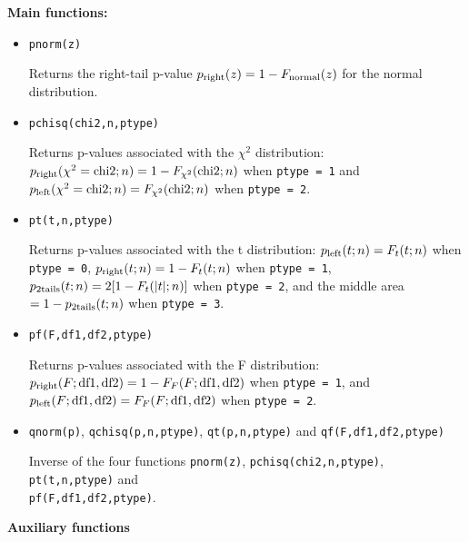 \documentclass[12pt]{article}
\begin{document}
{\bf Main functions:} 

\begin{itemize} 
\item {\tt pnorm(z)} 

Returns the right-tail p-value $p_{\rm right}(z)=1-F_{\rm normal}(z)$ 
for the normal distribution. 

\item {\tt pchisq(chi2,n,ptype)}

Returns p-values associated with the $\chi^2$ distribution: 
$p_{\rm right}(\chi^2={\rm chi2};n)=1-F_{\chi^2}({\rm chi2};n)$ when {\tt ptype = 1} and
$p_{\rm left}(\chi^2={\rm chi2};n)=F_{\chi^2}({\rm chi2};n)$ when {\tt ptype = 2}.

\item {\tt pt(t,n,ptype)}

Returns p-values associated with the t distribution:
$p_{\rm left}(t;n)=F_t(t;n)$ when {\tt ptype = 0},
$p_{\rm right}(t;n)=1-F_t(t;n)$ when {\tt ptype = 1},
$p_{\rm 2tails}(t;n)=2[1-F_t(|t|;n)]$ when {\tt ptype = 2},
and the middle area $=1-p_{\rm 2tails}(t;n)$ when {\tt ptype = 3}.

\item {\tt pf(F,df1,df2,ptype)}

Returns p-values associated with the F distribution:
$p_{\rm right}(F; {\rm df1,df2})=1-F_F(F; {\rm df1,df2})$ when
{\tt ptype = 1}, and $p_{\rm left}(F; {\rm df1,df2})=F_F(F; {\rm df1,df2})$ when
{\tt ptype = 2}.

\item {\tt qnorm(p)}, {\tt qchisq(p,n,ptype)}, {\tt qt(p,n,ptype)} and {\tt qf(F,df1,df2,ptype)} 

Inverse of the four functions {\tt pnorm(z)}, {\tt pchisq(chi2,n,ptype)}, 
{\tt pt(t,n,ptype)} and \\ {\tt pf(F,df1,df2,ptype)}.
\end{itemize}

{\bf Auxiliary functions}
\end{document}
